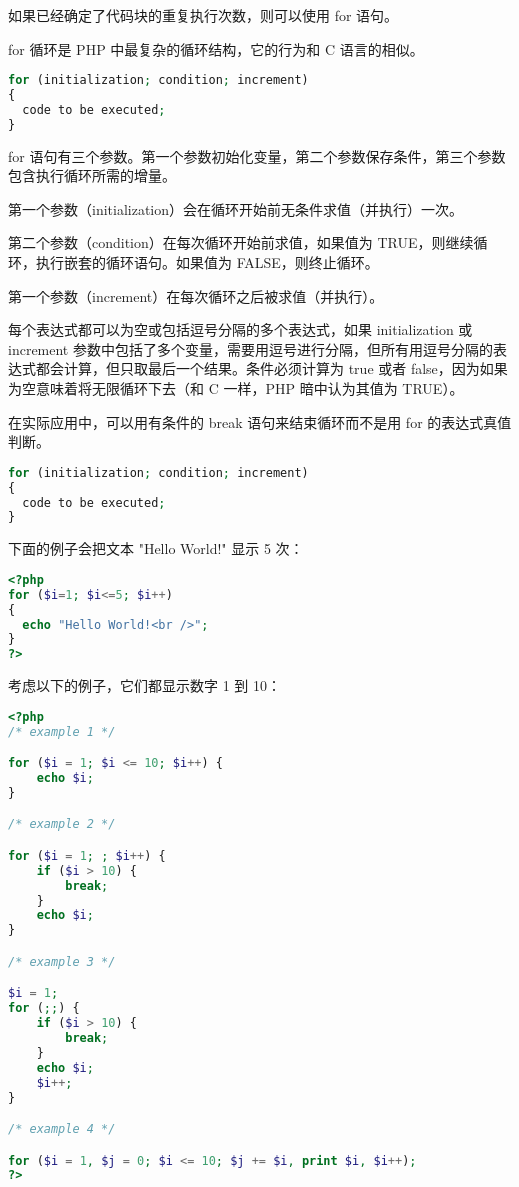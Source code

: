 如果已经确定了代码块的重复执行次数，则可以使用 for 语句。

for 循环是 PHP 中最复杂的循环结构，它的行为和 C 语言的相似。 

\begin{lstlisting}[language=PHP]
for (initialization; condition; increment)
{
  code to be executed;
}
\end{lstlisting}




for 语句有三个参数。第一个参数初始化变量，第二个参数保存条件，第三个参数包含执行循环所需的增量。

\begin{compactitem}
\item 第一个参数（initialization）会在循环开始前无条件求值（并执行）一次。
\item 第二个参数（condition）在每次循环开始前求值，如果值为 TRUE，则继续循环，执行嵌套的循环语句。如果值为 FALSE，则终止循环。
\item 第一个参数（increment）在每次循环之后被求值（并执行）。
\end{compactitem}




每个表达式都可以为空或包括逗号分隔的多个表达式，如果 initialization 或 increment 参数中包括了多个变量，需要用逗号进行分隔，但所有用逗号分隔的表达式都会计算，但只取最后一个结果。条件必须计算为 true 或者 false，因为如果为空意味着将无限循环下去（和 C 一样，PHP 暗中认为其值为 TRUE）。

在实际应用中，可以用有条件的 break 语句来结束循环而不是用 for 的表达式真值判断。

\begin{lstlisting}[language=PHP]
for (initialization; condition; increment)
{
  code to be executed;
}
\end{lstlisting}

下面的例子会把文本 "Hello World!" 显示 5 次：

\begin{lstlisting}[language=PHP]
<?php
for ($i=1; $i<=5; $i++)
{
  echo "Hello World!<br />";
}
?>
\end{lstlisting}

考虑以下的例子，它们都显示数字 1 到 10：

\begin{lstlisting}[language=PHP]
<?php
/* example 1 */

for ($i = 1; $i <= 10; $i++) {
    echo $i;
}

/* example 2 */

for ($i = 1; ; $i++) {
    if ($i > 10) {
        break;
    }
    echo $i;
}

/* example 3 */

$i = 1;
for (;;) {
    if ($i > 10) {
        break;
    }
    echo $i;
    $i++;
}

/* example 4 */

for ($i = 1, $j = 0; $i <= 10; $j += $i, print $i, $i++);
?>
\end{lstlisting}


